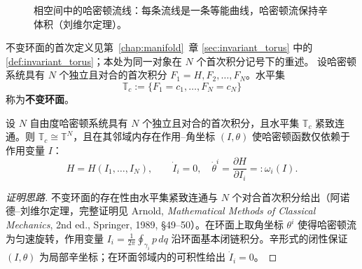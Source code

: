 \begin{figure}[htbp]
\centering
{}
\caption{相空间中的哈密顿流线：每条流线是一条等能曲线，哈密顿流保持辛体积（刘维尔定理）。}
\label{fig:ps_hamiltonian_flow}
\end{figure}

\begin{definition}[不变环面]\label{def:ps_invariant_torus}
不变环面的首次定义见第~\ref{chap:manifold}~章 \cref{sec:invariant_torus} 中的 \cref{def:invariant_torus}；本处为同一对象在 $N$ 个首次积分记号下的重述。
设哈密顿系统具有 $N$ 个独立且对合的首次积分 $F_1=H,F_2,\dots,F_N$。水平集
\[
\mathbb{T}_{c} := \{F_1=c_1, \dots, F_N=c_N\}
\]
称为\textbf{不变环面}。
\end{definition}

\begin{theorem}\label{thm:ps_liouville_arnold}
设 $N$ 自由度哈密顿系统具有 $N$ 个独立且对合的首次积分，且水平集 $\mathbb{T}_{c}$ 紧致连通。则 $\mathbb{T}_{c}\cong\mathbb{T}^N$，且在其邻域内存在作用--角坐标 $(I,\theta)$ 使哈密顿函数仅依赖于作用变量 $I$：
\[
H = H(I_1,\dots,I_N), \qquad \dot{I}_i = 0, \quad \dot{\theta}^i = \frac{\partial H}{\partial I_i} =: \omega_i(I).
\]
\end{theorem}

\begin{proof}[证明思路]
不变环面的存在性由水平集紧致连通与 $N$ 个对合首次积分给出（阿诺德--刘维尔定理，完整证明见 Arnold, \textit{Mathematical Methods of Classical Mechanics}, 2nd ed., Springer, 1989, \S{}49--50）。在环面上取角坐标 $\theta^i$ 使得哈密顿流为匀速旋转，作用变量 $I_i = \frac{1}{2\pi}\oint_{\gamma_i}p\,dq$ 沿环面基本闭链积分。辛形式的闭性保证 $(I,\theta)$ 为局部辛坐标；在环面邻域内的可积性给出 $\dot{I}_i=0$。
\end{proof}

